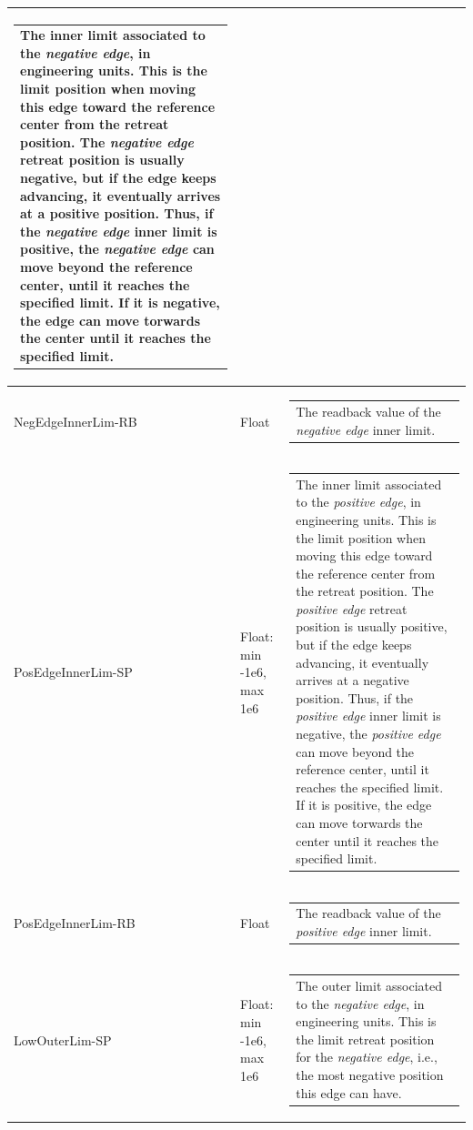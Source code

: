 \documentclass[openany]{article}
\begin{document}
\begin{longtable}{| m{4.5cm} m{2.5cm}  m{7.0cm} |}
\begin{tabular}{@{}m{6cm}@{}}
                The inner limit associated to the \emph{negative edge}, in engineering units. This is the limit position when moving this edge toward the reference center from the retreat position. The \emph{negative edge} retreat position is usually negative, but if the edge keeps advancing, it eventually arrives at a positive position. Thus, if the \emph{negative edge} inner limit is positive, the \emph{negative edge} can move beyond the reference center, until it reaches the specified limit. If it is negative, the edge can move torwards the center until it reaches the specified limit.
            \end{tabular} \hypertarget{}{}\\ \hline
        NegEdgeInnerLim-RB & Float & \begin{tabular}{@{}m{6cm}@{}}
                The readback value of the \emph{negative edge} inner limit.
            \end{tabular} \hypertarget{pv:pos-edge-inner-lim}{}\\ \hline
        PosEdgeInnerLim-SP & Float: min -1e6, max 1e6 & \begin{tabular}{@{}m{6cm}@{}}
                The inner limit associated to the \emph{positive edge}, in engineering units. This is the limit position when moving this edge toward the reference center from the retreat position. The \emph{positive edge} retreat position is usually positive, but if the edge keeps advancing, it eventually arrives at a negative position. Thus, if the \emph{positive edge} inner limit is negative, the \emph{positive edge} can move beyond the reference center, until it reaches the specified limit. If it is positive, the edge can move torwards the center until it reaches the specified limit.
            \end{tabular} \hypertarget{}{}\\ \hline
        PosEdgeInnerLim-RB & Float & \begin{tabular}{@{}m{6cm}@{}}
                The readback value of the \emph{positive edge} inner limit.
            \end{tabular} \hypertarget{pv:low-outer-lim}{}\\ \hline
        LowOuterLim-SP & Float: min -1e6, max 1e6 & \begin{tabular}{@{}m{6cm}@{}}
                The outer limit associated to the \emph{negative edge}, in engineering units. This is the limit retreat position for the \emph{negative edge}, i.e., the most negative position this edge can have.

\end{tabular}
\end{longtable}
\end{document}
